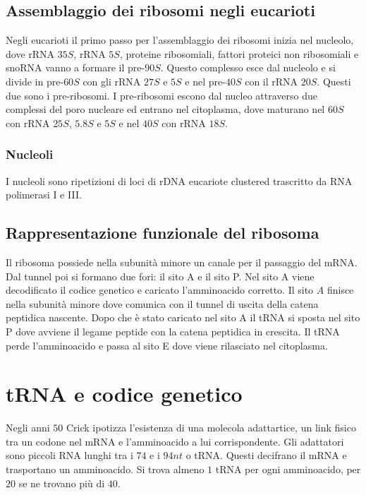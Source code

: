 \subsection{Assemblaggio dei ribosomi negli eucarioti}
Negli eucarioti il primo passo per l'assemblaggio dei ribosomi inizia nel nucleolo, dove rRNA $35S$, rRNA $5S$, proteine ribosomiali, fattori proteici non ribosomiali e snoRNA vanno a formare il pre-$90S$.
Questo complesso esce dal nucleolo e si divide in pre-$60S$ con gli rRNA $27S$ e $5S$ e nel pre-$40S$ con il rRNA $20S$. Questi due sono i pre-ribosomi. I pre-ribosomi escono dal nucleo attraverso due 
complessi del poro nucleare ed entrano nel citoplasma, dove maturano nel $60S$ con rRNA $25S$, $5.8S$ e $5S$ e nel $40S$ con rRNA $18S$.
\subsubsection{Nucleoli}
I nucleoli sono ripetizioni di loci di rDNA eucariote clustered trascritto da RNA polimerasi I e III.
\subsection{Rappresentazione funzionale del ribosoma}
Il ribosoma possiede nella subunit\`a minore un canale per il passaggio del mRNA. Dal tunnel poi si formano due fori: il sito A e il sito P. Nel sito A viene decodificato il codice genetico e caricato 
l'amminoacido corretto. Il sito $A$ finisce nella subunit\`a minore dove comunica con il tunnel di uscita della catena peptidica nascente. Dopo che \`e stato caricato nel sito A il tRNA si sposta 
nel sito P dove avviene il legame peptide con la catena peptidica in crescita. Il tRNA perde l'amminoacido e passa al sito E dove viene rilasciato nel citoplasma. 
\section{tRNA e codice genetico}
Negli anni $50$ Crick ipotizza l'esistenza di una molecola adattartice, un link fisico tra un codone nel mRNA e l'amminoacido a lui corrispondente. Gli adattatori sono piccoli RNA lunghi tra i $74$ e i 
$94nt$ o tRNA. Questi decifrano il mRNA e trasportano un amminoacido. Si trova almeno $1$ tRNA per ogni amminoacido, per $20$ se ne trovano pi\`u di $40$. 
